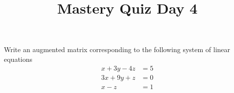 \documentclass{sbgquiz}
\title{Mastery Quiz Day 4 }
\begin{document}
\begin{problem}[E1]
Write an augmented matrix corresponding to the following system of linear equations
\begin{align*}
x+3y-4z &= 5 \\
3x+9y+z &= 0 \\
x-z &= 1
\end{align*}
\end{problem}
\end{document}
